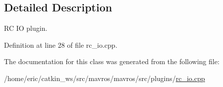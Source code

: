 \subsection{Detailed Description}
RC IO plugin. 

Definition at line 28 of file rc\+\_\+io.\+cpp.



The documentation for this class was generated from the following file\+:\begin{DoxyCompactItemize}
\item 
/home/eric/catkin\+\_\+ws/src/mavros/mavros/src/plugins/\mbox{\hyperlink{rc__io_8cpp}{rc\+\_\+io.\+cpp}}\end{DoxyCompactItemize}
